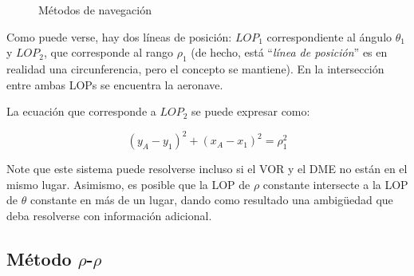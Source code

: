 \documentclass[a4paper,12pt,twoside]{article}
\begin{document}
\begin{figure}[!h]
  \centering
  \caption{M\'etodos de navegaci\'on}
\end{figure}


Como puede verse, hay dos l\'ineas de posici\'on: $LOP_1$ correspondiente al \'angulo $\theta_1$ y $LOP_2$, que corresponde al rango $\rho_1$ (de hecho, est\'a ``\textit{l\'inea de posici\'on}'' es en realidad una circunferencia, pero el concepto se mantiene). En la intersecci\'on entre ambas LOPs se encuentra la aeronave.

La ecuaci\'on que corresponde a $LOP_2$ se puede expresar como:


\[ (y_A - y_1)^2 + (x_A - x_1)^2 = \rho_{1}^{2} \]

Note que este sistema puede resolverse incluso si el VOR y el DME no est\'an en el mismo lugar. Asimismo, es posible que la LOP de $\rho$ constante intersecte a la LOP de $\theta$ constante en m\'as de un lugar, dando como resultado una ambigüedad que deba resolverse con informaci\'on adicional. 


\subsection{M\'etodo $\rho$-$\rho$}
\end{document}
